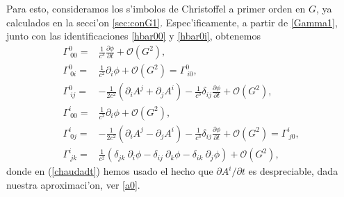 Para esto, consideramos los s'imbolos de Christoffel a primer orden en $G$, ya calculados en la secci'on \ref{sec:conG1}. Espec'ificamente, a partir de \eqref{Gamma1}, junto con las identificaciones \eqref{hbar00} y \eqref{hbar0i}, obtenemos
\begin{align}
\Gamma^0_{\ 0 0}={}&\frac{1}{c^3}\frac{\partial \phi}{\partial t}+\mathcal{O}(G^2),\label{simbolo1}\\
\Gamma^0_{\ 0 i}={}&\frac{1}{c^2}\partial_i\phi+\mathcal{O}(G^2)=\Gamma^0_{\ i 0},\\
\Gamma^0_{\ i j}={}&-\frac{1}{2c^2}\left( \partial_i A^{j}+\partial_j A^{i}\right)-\frac{1}{c^3}\delta_{ij}\frac{\partial \phi}{\partial t}+\mathcal{O}(G^2),\label{simbolo3}\\
\Gamma^i_{\ 0 0}={}&\frac{1}{c^2}\partial_i \phi+\mathcal{O}(G^2),\label{chaudadt}\\
\Gamma^i_{\ 0 j}={}&-\frac{1}{2c^2}\left(\partial_i A^{j}-\partial_j A^{i}\right)-\frac{1}{c^3}\delta_{ij}\frac{\partial \phi}{\partial t}+\mathcal{O}(G^2)=\Gamma^i_{\ j 0},\\
\Gamma^i_{\ j k}={}&\frac{1}{c^2}\left( \delta_{jk}\ \partial_i\phi-\delta_{ij}\ \partial_k\phi-\delta_{ik}\ \partial_j\phi \right)+\mathcal{O}(G^2)\label{simbolo6},
\end{align}
donde en (\ref{chaudadt}) hemos usado el hecho que $\partial A^{i}/\partial t$ es despreciable, dada nuestra aproximaci'on, ver \eqref{a0}.

